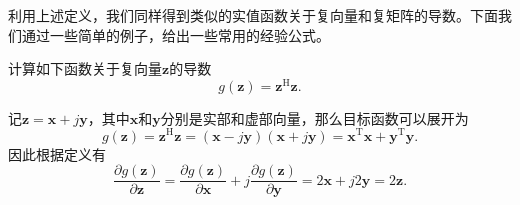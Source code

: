 利用上述定义，我们同样得到类似的实值函数关于复向量和复矩阵的导数。下面我们通过一些简单的例子，给出一些常用的经验公式。

\begin{example}
    计算如下函数关于复向量\( \bm{z} \)的导数
    \[
        g(\bm{z}) = \bm{z}^{\mathrm{H}} \bm{z}.
    \]
\end{example}
\begin{solution}
    记\( \bm{z} = \bm{x} + j \bm{y} \)，其中\( \bm{x} \)和\( \bm{y} \)分别是实部和虚部向量，那么目标函数可以展开为
    \[
        g(\bm{z}) = \bm{z}^{\mathrm{H}} \bm{z} = (\bm{x} - j \bm{y})(\bm{x} + j \bm{y}) = \bm{x}^{\mathrm{T}} \bm{x} + \bm{y}^{\mathrm{T}} \bm{y}.
    \]
    因此根据定义有
    \[
        \frac{\partial g(\bm{z})}{\partial \bm{z}} = \frac{\partial g(\bm{z})}{\partial \bm{x}} + j \frac{\partial g(\bm{z})}{\partial \bm{y}} = 2\bm{x} + j 2\bm{y} = 2\bm{z}.
    \]
\end{solution}

